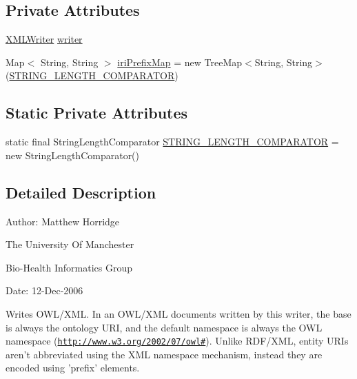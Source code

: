 \subsection*{Private Attributes}
\begin{DoxyCompactItemize}
\item 
\hyperlink{interfaceorg_1_1coode_1_1xml_1_1_x_m_l_writer}{X\-M\-L\-Writer} \hyperlink{classorg_1_1coode_1_1owlapi_1_1owlxml_1_1renderer_1_1_o_w_l_x_m_l_writer_a24cf98dc6ff2672642fb9e36e814078f}{writer}
\item 
Map$<$ String, String $>$ \hyperlink{classorg_1_1coode_1_1owlapi_1_1owlxml_1_1renderer_1_1_o_w_l_x_m_l_writer_abfdcc089de13fbd9276de0d61abdedd4}{iri\-Prefix\-Map} = new Tree\-Map$<$String, String$>$(\hyperlink{classorg_1_1coode_1_1owlapi_1_1owlxml_1_1renderer_1_1_o_w_l_x_m_l_writer_ae73917015034ad7d60791fc807355f04}{S\-T\-R\-I\-N\-G\-\_\-\-L\-E\-N\-G\-T\-H\-\_\-\-C\-O\-M\-P\-A\-R\-A\-T\-O\-R})
\end{DoxyCompactItemize}
\subsection*{Static Private Attributes}
\begin{DoxyCompactItemize}
\item 
static final String\-Length\-Comparator \hyperlink{classorg_1_1coode_1_1owlapi_1_1owlxml_1_1renderer_1_1_o_w_l_x_m_l_writer_ae73917015034ad7d60791fc807355f04}{S\-T\-R\-I\-N\-G\-\_\-\-L\-E\-N\-G\-T\-H\-\_\-\-C\-O\-M\-P\-A\-R\-A\-T\-O\-R} = new String\-Length\-Comparator()
\end{DoxyCompactItemize}


\subsection{Detailed Description}
Author\-: Matthew Horridge\par
 The University Of Manchester\par
 Bio-\/\-Health Informatics Group\par
 Date\-: 12-\/\-Dec-\/2006\par
\par
 Writes O\-W\-L/\-X\-M\-L. In an O\-W\-L/\-X\-M\-L documents written by this writer, the base is always the ontology U\-R\-I, and the default namespace is always the O\-W\-L namespace (\href{http://www.w3.org/2002/07/owl#}{\tt http\-://www.\-w3.\-org/2002/07/owl\#}). Unlike R\-D\-F/\-X\-M\-L, entity U\-R\-Is aren't abbreviated using the X\-M\-L namespace mechanism, instead they are encoded using 'prefix' elements. 

